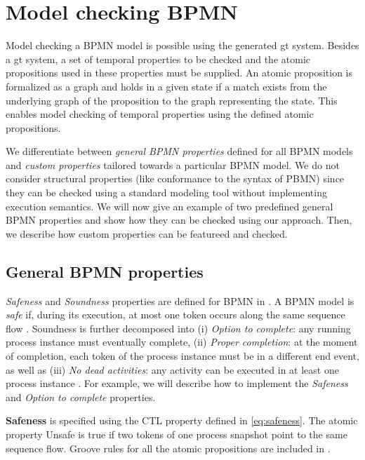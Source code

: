 \documentclass[runningheads]{llncs}
\begin{document}
\section{Model checking BPMN} \label{sec:modelChecking}

Model checking a BPMN model is possible using the generated \gls*{gt} system.
Besides a \gls*{gt} system, a set of temporal properties to be checked and the atomic propositions used in these properties must be supplied.
An atomic proposition is formalized as a graph and holds in a given state if a match exists from the underlying graph of the proposition to the graph representing the state.
This enables model checking of temporal properties using the defined atomic propositions.

We differentiate between \emph{general BPMN properties} defined for all BPMN models and \emph{custom properties} tailored towards a particular BPMN model.
We do not consider structural properties (like conformance to the syntax of PBMN) since they can be checked using a standard modeling tool without implementing execution semantics.
We will now give an example of two predefined general BPMN properties and show how they can be checked using our approach.
Then, we describe how custom properties can be featureed and checked.

\subsection{General BPMN properties}
\textit{Safeness} and \textit{Soundness} properties are defined for BPMN in \cite{corradiniClassificationBPMNCollaborations2018}.
A BPMN model is \emph{safe} if, during its execution, at most one token occurs along the same sequence flow \cite{corradiniClassificationBPMNCollaborations2018}.
Soundness is further decomposed into (i) \emph{Option to complete}: any running process instance must eventually complete, (ii) \emph{Proper completion}: at the moment of completion, each token of the process instance must be in a different end event, as well as (iii) \emph{No dead activities}: any activity can be executed in at least one process instance \cite{corradiniClassificationBPMNCollaborations2018}.
For example, we will describe how to implement the \emph{Safeness} and \emph{Option to complete} properties.

\textbf{Safeness} is specified using the CTL property defined in \eqref{eq:safeness}.
The atomic property \textsf{Unsafe} is true if two tokens of one process snapshot point to the same sequence flow.
Groove rules for all the atomic propositions are included in \cite{krauterArtifactsICGT2023}.
\end{document}
